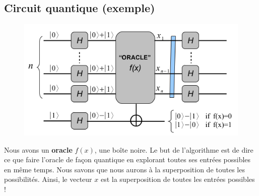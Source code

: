 

\subsection{Circuit quantique (exemple)}
	\begin{figure}
	\vspace{-5mm}
	\includegraphics[scale=0.3]{ch1/image11}
	\end{figure}
Nous avons un \textbf{oracle} $f(x)$, une boîte noire. Le but de l'algorithme est de dire
ce que faire l'oracle de façon quantique en explorant toutes ses entrées possibles en même temps.
Nous savons que nous aurons à la superposition de toutes les possibilités. Ainsi, le
vecteur $x$ est la superposition de toutes les entrées possibles !\\

